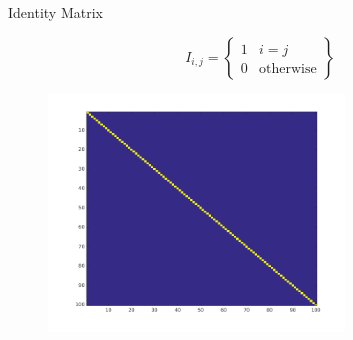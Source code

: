 \documentclass{beamer}
\begin{document}
\begin{frame}{Identity Matrix}

\[I_{i, j} = \left\{ \begin{array}{cc} 1 &  i = j \\ 0 & \text{otherwise} \end{array} \right\} \]

\begin{figure}[t]
	\centering
    \includegraphics[width=0.7\textwidth]{IdentityMatrix.png}
\end{figure}

\end{frame}
\end{document}
